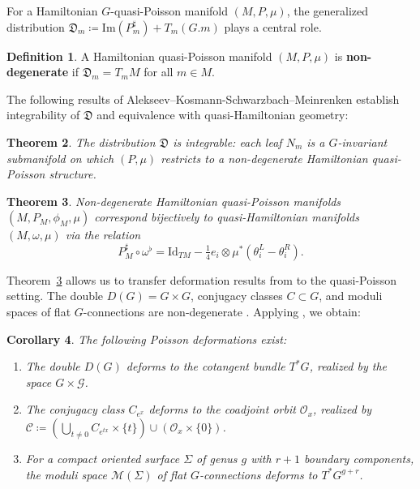 \documentclass[reqno]{amsart}
\theoremstyle{plain}
\newtheorem{Thm}{Theorem}[section]
\newtheorem{Cor}[Thm]{Corollary}
\theoremstyle{definition}
\newtheorem{Def}[Thm]{Definition}
\begin{document}
For a Hamiltonian $G$-quasi-Poisson manifold $(M,P,\mu)$, the generalized distribution $\mathfrak{D}_{m} \coloneqq \mathrm{Im}(P_{m}^{\sharp}) + T_{m}(G.m)$ plays a central role.

\begin{Def}
A Hamiltonian quasi-Poisson manifold $(M,P,\mu)$ is \textbf{non-degenerate} if $\mathfrak{D}_{m} = T_{m}M$ for all $m\in M$.
\end{Def}

The following results of Alekseev--Kosmann-Schwarzbach--Meinrenken establish integrability of $\mathfrak{D}$ and equivalence with quasi-Hamiltonian geometry:

\begin{Thm}\cite[]{alekseev2002quasi}\label{thm:integrability}
The distribution $\mathfrak{D}$ is integrable: each leaf $N_{m}$ is a $G$-invariant submanifold on which $(P,\mu)$ restricts to a non-degenerate Hamiltonian quasi-Poisson structure.
\end{Thm}

\begin{Thm}\cite[]{alekseev2002quasi} \label{equivalence}
Non-degenerate Hamiltonian quasi-Poisson manifolds $(M,P_{M},\phi_{M},\mu)$ correspond bijectively to quasi-Hamiltonian manifolds $(M,\omega,\mu)$ via the relation
\begin{equation} \label{eq 1}
P_{M}^{\sharp}\circ \omega^{\flat} = \mathrm{Id}_{TM} - \tfrac{1}{4}e_{i}\otimes \mu^{*}(\theta^{L}_{i} - \theta^{R}_{i}).
\end{equation}
\end{Thm}

Theorem~\ref{equivalence} allows us to transfer deformation results from \cite{JMM2025deformations} to the quasi-Poisson setting. The double $D(G) = G\times G$, conjugacy classes $C \subset G$, and moduli spaces of flat $G$-connections are non-degenerate \cite{alekseev2002quasi}. Applying \cite[Theorems~4.1, 4.2, Corollary~4.3]{JMM2025deformations}, we obtain:

\begin{Cor}\label{cor:main-examples}
The following Poisson deformations exist:
\begin{enumerate}
\item The double $D(G)$ deforms to the cotangent bundle $T^{*}G$, realized by the space $G\times \mathcal{G}$.
\item The conjugacy class $C_{e^{x}}$ deforms to the coadjoint orbit $\mathcal{O}_x$, realized by $\mathcal{C}\coloneqq \left(\bigcup_{t\neq 0} C_{e^{tx}}\times \{t\}\right) \cup \left(\mathcal{O}_{x}\times \{0\}\right)$.
\item For a compact oriented surface $\Sigma$ of genus $g$ with $r+1$ boundary components, the moduli space $\mathcal{M}(\Sigma)$ of flat $G$-connections deforms to $T^{*}G^{g+r}$.
\end{enumerate}
\end{Cor}
\end{document}
